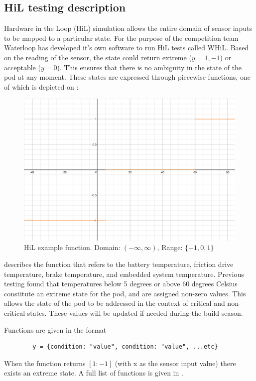 \documentclass[main.tex]{subfiles}
\begin{document}
   \subsection{HiL testing description}
   Hardware in the Loop (HiL) simulation allows the entire domain of sensor inputs to be mapped to a particular state. For the purpose of the competition team Waterloop has developed it's own software to run HiL tests called WHiL. Based on the reading of the sensor, the state could return extreme ($y = 1, -1$) or acceptable ($y = 0$). This ensures that there is no ambiguity in the state of the pod at any moment. These states are expressed through piecewise functions, one of which is depicted on :

  \begin{figure}
        \centering
        \includegraphics[width=\textwidth]{images/HiL-example-function.png}
        \caption{HiL example function. Domain: $(-\infty, \infty)$, Range: $\{-1,0,1\}$}
        \label{fig:hil-function}
    \end{figure}

 describes the function that refers to the battery temperature, friction drive temperature, brake temperature, and embedded system temperature.
Previous testing found that temperatures below 5 degrees or above 60 degrees Celsius constitute an extreme state for the pod, and are assigned non-zero values. This allows the state of the pod to be addressed in the context of critical and non-critical states. These values will be updated if needed during the build season.

\bigskip
\noindent Functions are given in the format 
	\begin{verbatim}
    	y = {condition: "value", condition: "value", ...etc}
    \end{verbatim}
When the function returns $[1:-1]$ (with x as the sensor input value) there exists an extreme state. A full list of functions is given in .
\end{document}
